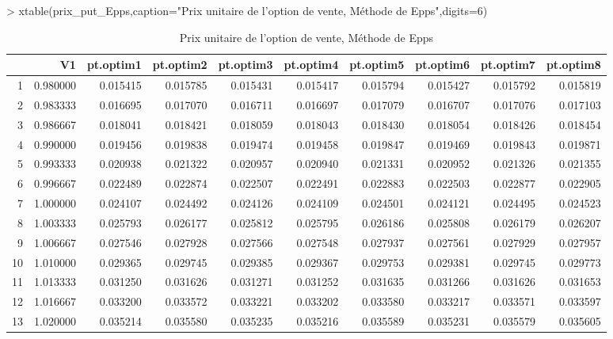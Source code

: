 \documentclass[letter]{report}
\begin{document}
\begin{Schunk}
\begin{Sinput}
> 	xtable(prix_put_Epps,caption="Prix unitaire de l'option de vente, Méthode de Epps",digits=6)
\end{Sinput}
% latex table generated in R 3.0.2 by xtable 1.7-4 package
% Mon Oct 13 12:28:07 2014
\begin{table}[ht]
\centering
\begin{tabular}{rrrrrrrrrr}
  \hline
 & V1 & pt.optim1 & pt.optim2 & pt.optim3 & pt.optim4 & pt.optim5 & pt.optim6 & pt.optim7 & pt.optim8 \\ 
  \hline
1 & 0.980000 & 0.015415 & 0.015785 & 0.015431 & 0.015417 & 0.015794 & 0.015427 & 0.015792 & 0.015819 \\ 
  2 & 0.983333 & 0.016695 & 0.017070 & 0.016711 & 0.016697 & 0.017079 & 0.016707 & 0.017076 & 0.017103 \\ 
  3 & 0.986667 & 0.018041 & 0.018421 & 0.018059 & 0.018043 & 0.018430 & 0.018054 & 0.018426 & 0.018454 \\ 
  4 & 0.990000 & 0.019456 & 0.019838 & 0.019474 & 0.019458 & 0.019847 & 0.019469 & 0.019843 & 0.019871 \\ 
  5 & 0.993333 & 0.020938 & 0.021322 & 0.020957 & 0.020940 & 0.021331 & 0.020952 & 0.021326 & 0.021355 \\ 
  6 & 0.996667 & 0.022489 & 0.022874 & 0.022507 & 0.022491 & 0.022883 & 0.022503 & 0.022877 & 0.022905 \\ 
  7 & 1.000000 & 0.024107 & 0.024492 & 0.024126 & 0.024109 & 0.024501 & 0.024121 & 0.024495 & 0.024523 \\ 
  8 & 1.003333 & 0.025793 & 0.026177 & 0.025812 & 0.025795 & 0.026186 & 0.025808 & 0.026179 & 0.026207 \\ 
  9 & 1.006667 & 0.027546 & 0.027928 & 0.027566 & 0.027548 & 0.027937 & 0.027561 & 0.027929 & 0.027957 \\ 
  10 & 1.010000 & 0.029365 & 0.029745 & 0.029385 & 0.029367 & 0.029753 & 0.029381 & 0.029745 & 0.029773 \\ 
  11 & 1.013333 & 0.031250 & 0.031626 & 0.031271 & 0.031252 & 0.031635 & 0.031266 & 0.031626 & 0.031653 \\ 
  12 & 1.016667 & 0.033200 & 0.033572 & 0.033221 & 0.033202 & 0.033580 & 0.033217 & 0.033571 & 0.033597 \\ 
  13 & 1.020000 & 0.035214 & 0.035580 & 0.035235 & 0.035216 & 0.035589 & 0.035231 & 0.035579 & 0.035605 \\ 
   \hline
\end{tabular}
\caption{Prix unitaire de l'option de vente, Méthode de Epps} 
\end{table}\end{Schunk}
\end{document}

